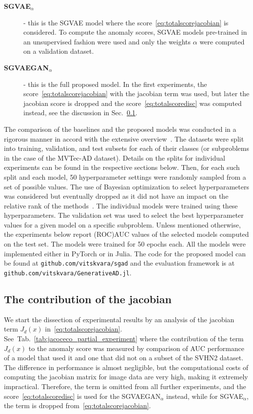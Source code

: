 \begin{description}
    \item[\textbf{SGVAE$_{\alpha}$}] - this is the SGVAE model where the score~\eqref{eq:totalscorejacobian} is considered. To compute the anomaly scores,  SGVAE models pre-trained in an unsupervised fashion were used and only the weights $\alpha$ were computed on a validation dataset.
    \item[\textbf{SGVAEGAN$_{\alpha}$}] - this is the full proposed model. In the first experiments, the score~\eqref{eq:totalscorejacobian} with the jacobian term was used, but later the jacobian score is dropped and the score~\eqref{eq:totalscoredisc} was computed instead, see the discussion in Sec.~\ref{sec:jacobian_contribution}.
\end{description}

The comparison of the baselines and the proposed models was conducted in a rigorous manner in accord with the extensive overview~\cite{vskvara2021comparison}. The datasets were split into training, validation, and test subsets for each of their classes (or subproblems in the case of the MVTec-AD dataset). Details on the splits for individual experiments can be found in the respective sections below. Then, for each such split and each model, 50 hyperparameter settings were randomly sampled from a set of possible values. The use of Bayesian optimization to select hyperparameters was considered but eventually dropped as it did not have an impact on the relative rank of the methods~\cite{vskvara2021comparison}. The individual models were trained using these hyperparameters. The validation set was used to select the best hyperparameter values for a given model on a specific subproblem. Unless mentioned otherwise, the experiments below report (ROC)AUC values of the selected models computed on the test set. The models were trained for 50 epochs each. All the models were implemented either in PyTorch or in Julia. The code for the proposed model can be found at \texttt{github.com/vitskvara/sgad} and the evaluation framework is at \texttt{github.com/vitskvara/GenerativeAD.jl}. 

\subsection{The contribution of the jacobian} \label{sec:jacobian_contribution}

We start the dissection of experimental results by an analysis of the jacobian term $J_d(x)$ in~\eqref{eq:totalscorejacobian}. See~Tab.~\ref{tab:jacoceco_partial_experiment} where the contribution of the term $J_d(x)$ to the anomaly score was measured by comparison of AUC performance of a model that used it and one that did not on a subset of the SVHN2 dataset. The difference in performance is almost negligible, but the computational costs of computing the jacobian matrix for image data are very high, making it extremely impractical. Therefore, the term is omitted from all further experiments, and the score~\eqref{eq:totalscoredisc} is used for the SGVAEGAN$_{\alpha}$ instead, while for SGVAE$_\alpha$, the term is dropped from~\eqref{eq:totalscorejacobian}.

